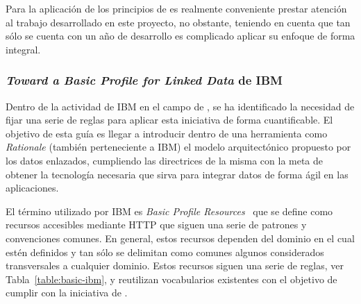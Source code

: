 Para la aplicación de los principios de \linkeddata es realmente conveniente prestar atención al trabajo
desarrollado en este proyecto, no obstante, teniendo en cuenta que tan sólo se cuenta con un año de desarrollo
es complicado aplicar su enfoque de forma integral.

\subsubsection{\textit{Toward a Basic Profile for Linked Data} de IBM}
Dentro de la actividad de IBM en el campo de \linkeddata, se ha identificado
la necesidad de fijar una serie de reglas para aplicar esta iniciativa de forma
cuantificable. El objetivo de esta guía es llegar a introducir dentro de una herramienta
como \textit{Rationale} (también perteneciente a IBM) el modelo arquitectónico propuesto por los datos
enlazados, cumpliendo las directrices de la misma con la meta de obtener
la tecnología necesaria que sirva para integrar datos de forma ágil en las aplicaciones.

El término utilizado por IBM es \textit{Basic Profile Resources}~\cite{basic-profile-ibm} que se define como recursos \linkeddata accesibles mediante HTTP que siguen una serie de patrones
y convenciones comunes. En general, estos recursos dependen del dominio en el cual
estén definidos y tan sólo se delimitan como comunes algunos considerados transversales a cualquier dominio. Estos recursos siguen una serie de reglas, ver Tabla~\ref{table:basic-ibm}, y reutilizan
vocabularios existentes con el objetivo de cumplir con la iniciativa de \linkeddata. 

